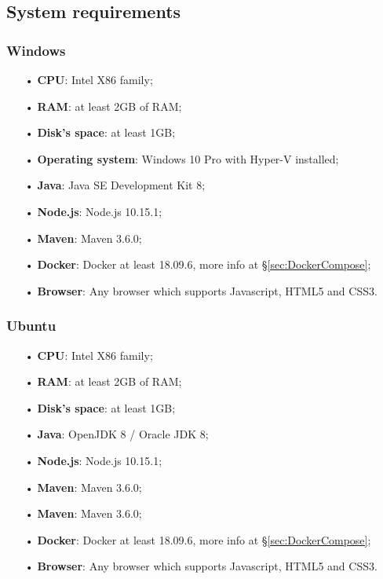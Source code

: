 \subsection{System requirements}
\subsubsection{Windows}
\begin{itemize}
\item [•]\textbf{CPU}: Intel X86 family;
\item [•]\textbf{RAM}: at least 2GB of RAM;
\item [•]\textbf{Disk's space}: at least 1GB;
\item [•]\textbf{Operating system}: Windows 10 Pro with Hyper-V installed;
\item [•]\textbf{Java}: Java SE Development Kit 8;
\item [•]\textbf{Node.js}: Node.js 10.15.1;
\item [•]\textbf{Maven}: Maven 3.6.0;
\item [•]\textbf{Docker}: Docker at least 18.09.6, more info at §\ref{sec:DockerCompose};  
\item [•]\textbf{Browser}: Any browser which supports Javascript, HTML5 and CSS3.

\end{itemize}

\subsubsection{Ubuntu}
\begin{itemize}
\item [•]\textbf{CPU}: Intel X86 family;
\item [•]\textbf{RAM}: at least 2GB of RAM;
\item [•]\textbf{Disk's space}: at least 1GB;
\item [•]\textbf{Java}: OpenJDK 8 / Oracle JDK 8;
\item [•]\textbf{Node.js}: Node.js 10.15.1;
\item [•]\textbf{Maven}: Maven 3.6.0;
\item [•]\textbf{Maven}: Maven 3.6.0;
\item [•]\textbf{Docker}: Docker at least 18.09.6, more info at §\ref{sec:DockerCompose};   
\item [•]\textbf{Browser}: Any browser which supports Javascript, HTML5 and CSS3.
\end{itemize}

